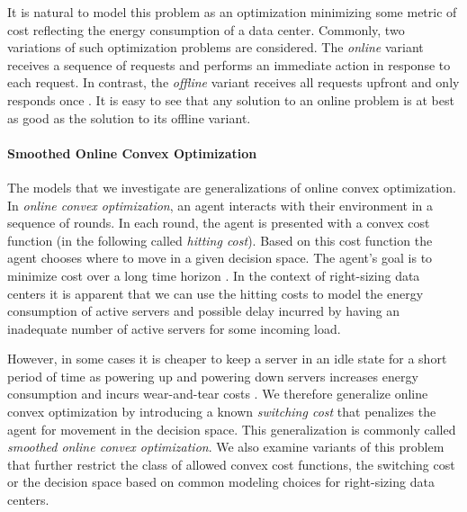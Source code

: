 It is natural to model this problem as an optimization minimizing some metric of cost reflecting the energy consumption of a data center. Commonly, two variations of such optimization problems are considered. The \emph{online} variant receives a sequence of requests and performs an immediate action in response to each request. In contrast, the \emph{offline} variant receives all requests upfront and only responds once \cite{Karp1992}. It is easy to see that any solution to an online problem is at best as good as the solution to its offline variant.

\paragraph{Smoothed Online Convex Optimization} The models that we investigate are generalizations of online convex optimization. In \emph{online convex optimization}, an agent interacts with their environment in a sequence of rounds. In each round, the agent is presented with a convex cost function (in the following called \emph{hitting cost}). Based on this cost function the agent chooses where to move in a given decision space. The agent's goal is to minimize cost over a long time horizon \cite{Hazan2019}. In the context of right-sizing data centers it is apparent that we can use the hitting costs to model the energy consumption of active servers and possible delay incurred by having an inadequate number of active servers for some incoming load.

However, in some cases it is cheaper to keep a server in an idle state for a short period of time as powering up and powering down servers increases energy consumption and incurs wear-and-tear costs \cite{Lin2011}. We therefore generalize online convex optimization by introducing a known \emph{switching cost} that penalizes the agent for movement in the decision space. This generalization is commonly called \emph{smoothed online convex optimization}. We also examine variants of this problem that further restrict the class of allowed convex cost functions, the switching cost or the decision space based on common modeling choices for right-sizing data centers.

